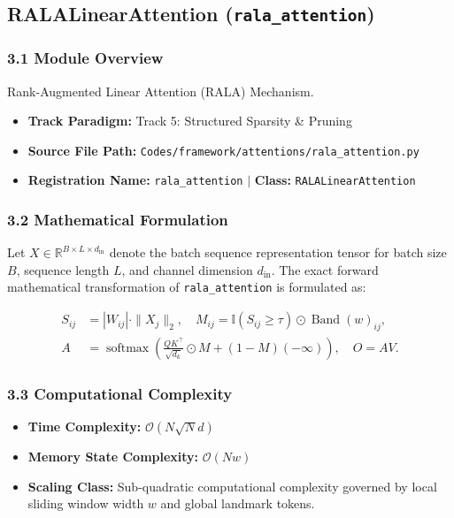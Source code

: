 \subsection{RALALinearAttention (\texttt{rala\_attention})}
\label{sec:app_module_rala_attention}

\subsubsection*{3.1 Module Overview}
Rank-Augmented Linear Attention (RALA) Mechanism.
\begin{itemize}
    \item \textbf{Track Paradigm:} Track 5: Structured Sparsity \& Pruning
    \item \textbf{Source File Path:} \texttt{Codes/framework/attentions/rala\_attention.py}
    \item \textbf{Registration Name:} \texttt{rala\_attention} $\mid$ \textbf{Class:} \texttt{RALALinearAttention}
\end{itemize}

\subsubsection*{3.2 Mathematical Formulation}
Let $X \in \mathbb{R}^{B \times L \times d_{\text{in}}}$ denote the batch sequence representation tensor for batch size $B$, sequence length $L$, and channel dimension $d_{\text{in}}$. The exact forward mathematical transformation of \texttt{rala\_attention} is formulated as:

\begin{align}
S_{ij} &= |W_{ij}| \cdot \|X_j\|_2, \quad M_{ij} = \mathbb{I}(S_{ij} \ge \tau) \odot \operatorname{Band}(w)_{ij}, \\
A &= \operatorname{softmax}\left(\frac{Q K^\top}{\sqrt{d_k}} \odot M + (1 - M)(-\infty)\right), \quad O = A V.
\end{align}


\subsubsection*{3.3 Computational Complexity}
\begin{itemize}
    \item \textbf{Time Complexity:} $\mathcal{O}(N \sqrt{N} d)$
    \item \textbf{Memory State Complexity:} $\mathcal{O}(N w)$
    \item \textbf{Scaling Class:} Sub-quadratic computational complexity governed by local sliding window width $w$ and global landmark tokens.
\end{itemize}


